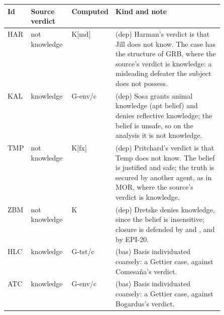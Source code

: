 \begin{center}\small
\begin{tabular}{@{}lllp{0.5\linewidth}@{}}\toprule
Id & Source verdict & Computed & Kind and note \\ \midrule
HAR & not knowledge & K[md] & (dep) Harman's verdict is that Jill does not know. The case has the structure of GRB, where the source's verdict is knowledge: a misleading defeater the subject does not possess. \\
KAL & knowledge & G-env/c & (dep) Sosa grants animal knowledge (apt belief) and denies reflective knowledge; the belief is unsafe, so on the analysis it is not knowledge. \\
TMP & not knowledge & K[fx] & (dep) Pritchard's verdict is that Temp does not know. The belief is justified and safe; the truth is secured by another agent, as in MOR, where the source's verdict is knowledge. \\
ZBM & not knowledge & K & (dep) Dretske denies knowledge, since the belief is insensitive; closure is defended by \citet{Williamson2000} and \citet{Hawthorne2004}, and by EPI-20. \\
HLC & knowledge & G-tst/c & (bas) Basis individuated coarsely: a Gettier case, against Comesa\~na's verdict. \\
ATC & knowledge & G-env/c & (bas) Basis individuated coarsely: a Gettier case, against Bogardus's verdict. \\
\bottomrule\end{tabular}\end{center}
